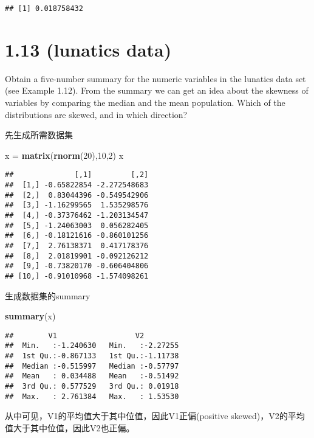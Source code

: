 \documentclass[]{article}
\newenvironment{Shaded}{\begin{snugshade}}{\end{snugshade}}
\newcommand{\DecValTok}[1]{\textcolor[rgb]{0.00,0.00,0.81}{#1}}
\newcommand{\KeywordTok}[1]{\textcolor[rgb]{0.13,0.29,0.53}{\textbf{#1}}}
\newcommand{\NormalTok}[1]{#1}
\newcommand{\StringTok}[1]{\textcolor[rgb]{0.31,0.60,0.02}{#1}}
\begin{document}
\begin{verbatim}
## [1] 0.018758432
\end{verbatim}

\hypertarget{lunatics-data}{%
\section{1.13 (lunatics data)}\label{lunatics-data}}

Obtain a five-number summary for the numeric variables in the lunatics
data set (see Example 1.12). From the summary we can get an idea about
the skewness of variables by comparing the median and the mean
population. Which of the distributions are skewed, and in which
direction?

先生成所需数据集

\begin{Shaded}
\begin{Highlighting}[]
\NormalTok{x =}\StringTok{ }\KeywordTok{matrix}\NormalTok{(}\KeywordTok{rnorm}\NormalTok{(}\DecValTok{20}\NormalTok{),}\DecValTok{10}\NormalTok{,}\DecValTok{2}\NormalTok{)}
\NormalTok{x}
\end{Highlighting}
\end{Shaded}

\begin{verbatim}
##              [,1]         [,2]
##  [1,] -0.65822854 -2.272548683
##  [2,]  0.83044396 -0.549542906
##  [3,] -1.16299565  1.535298576
##  [4,] -0.37376462 -1.203134547
##  [5,] -1.24063003  0.056282405
##  [6,] -0.18121616 -0.860101256
##  [7,]  2.76138371  0.417178376
##  [8,]  2.01819901 -0.092126212
##  [9,] -0.73820170 -0.606404806
## [10,] -0.91010968 -1.574098261
\end{verbatim}

生成数据集的summary

\begin{Shaded}
\begin{Highlighting}[]
\KeywordTok{summary}\NormalTok{(x)}
\end{Highlighting}
\end{Shaded}

\begin{verbatim}
##        V1                  V2          
##  Min.   :-1.240630   Min.   :-2.27255  
##  1st Qu.:-0.867133   1st Qu.:-1.11738  
##  Median :-0.515997   Median :-0.57797  
##  Mean   : 0.034488   Mean   :-0.51492  
##  3rd Qu.: 0.577529   3rd Qu.: 0.01918  
##  Max.   : 2.761384   Max.   : 1.53530
\end{verbatim}

从中可见，V1的平均值大于其中位值，因此V1正偏(positive
skewed)，V2的平均值大于其中位值，因此V2也正偏。
\end{document}
